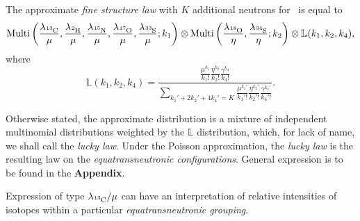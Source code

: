 \begin{result}\label{Fine structure law}
	The approximate \emph{fine structure law} with $K$ additional neutrons for \molecule\, is equal to 
	{\small
		\begin{equation*}
			\mathrm{Multi} \left(
				\frac{ \lambda_\cem{^{13}C} }{ \mu }, 
				\frac{ \lambda_\cem{^{2} H} }{ \mu }, 
				\frac{ \lambda_\cem{^{15}N} }{ \mu },
				\frac{ \lambda_\cem{^{17}O} }{ \mu }, 
				\frac{ \lambda_\cem{^{33}S} }{ \mu }; 
				k_1
			\right ) \otimes
			\mathrm{Multi} \left(
				\frac{ \lambda_\cem{^{18}O} }{ \eta },
				\frac{ \lambda_\cem{^{34}S} }{ \eta }; 
				k_2	
			\right) \otimes 
			\mathbb{L}( k_1, k_2, k_4 ),
		\end{equation*}
	}
	where 
	\begin{equation}\label{simple lucky law}
		\mathbb{L}( k_1, k_2, k_4 ) = 
		\frac{ \frac{ \mu^{k_1} }{ k_1! } \frac{ \eta^{k_2}}{ k_2! } \frac{ \gamma^{k_4} }{ k_4! } }{ 
			\underset{ k_1' + 2 k_2' + 4 k_4' = K}{\sum} 
				\frac{ \mu^{k_1'} }{ k_1'! } 
				\frac{ \eta^{k_2'}}{ k_2'! } 
				\frac{ \gamma^{k_4'}}{ k_4'! }
		}.
	\end{equation}
\end{result}

Otherwise stated, the approximate distribution is a mixture of independent multinomial distributions weighted by the $\mathbb{L}$ distribution, which, for lack of name, we shall call the {\it lucky law}. Under the Poisson approximation, the {\it lucky law} is the resulting law on the {\it equatransneutronic configurations}. General expression is to be found in the \textbf{Appendix}.

Expression of type $\lambda_\cem{^{13}C}/\mu $ can have an interpretation of relative intensities of isotopes within a particular {\it equatransneutronic grouping}.

